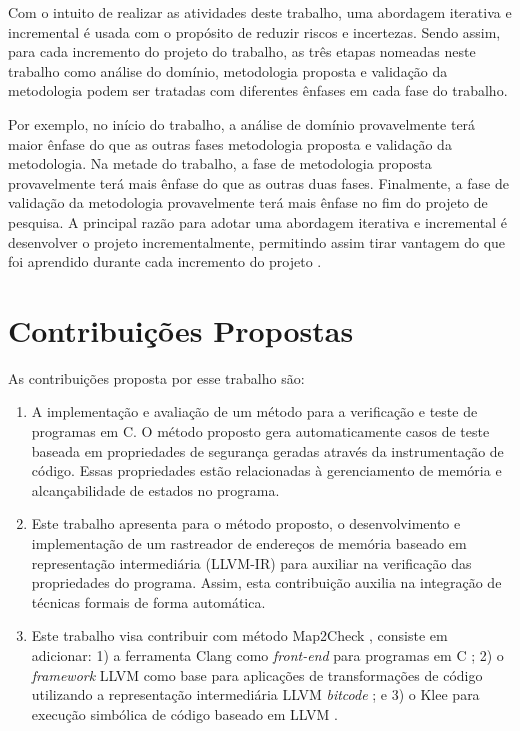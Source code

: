 \par
Com o intuito de realizar as atividades deste trabalho, uma abordagem iterativa e incremental é 
usada com o propósito de reduzir riscos e incertezas. Sendo assim, para cada incremento do
projeto do trabalho, as três etapas nomeadas neste trabalho como análise do domínio, metodologia proposta e validação da metodologia podem ser tratadas com diferentes ênfases em cada fase do trabalho.
\par
Por exemplo, no início do trabalho, a análise de domínio provavelmente terá maior ênfase do que as outras fases metodologia proposta e validação da metodologia. Na metade do trabalho, a fase de metodologia proposta provavelmente terá mais ênfase do que as outras duas fases. Finalmente, a fase de validação da metodologia provavelmente terá mais ênfase no fim do projeto de pesquisa. A principal razão para adotar uma abordagem iterativa e incremental é desenvolver o projeto incrementalmente, permitindo assim tirar vantagem do que foi aprendido durante cada incremento do projeto \cite{Schwaber:2002}.

\section{Contribuições Propostas}
As contribuições proposta por esse trabalho são: 
\begin{enumerate}
\item A implementação e avaliação de um método para a verificação e teste de programas em C. 
      O método proposto gera automaticamente casos de teste baseada em propriedades de segurança geradas através da instrumentação de código. Essas propriedades estão relacionadas à gerenciamento de memória e alcançabilidade de estados no programa.
      
\item  Este trabalho apresenta para o método proposto, o desenvolvimento e implementação de um 
      rastreador de endereços de memória baseado em representação intermediária (LLVM-IR) para auxiliar na verificação das propriedades do programa. Assim, esta contribuição auxilia na integração de técnicas formais de forma automática. 
      
\item Este trabalho visa contribuir com método Map2Check \cite{Rocha:2015}, consiste em 
     adicionar: 
     1) a ferramenta Clang como \textit{front-end} para programas em C \cite{LLVM:2017};
     2) o \textit{framework} LLVM como base para aplicações de transformações de código utilizando a representação intermediária LLVM \textit{bitcode} \cite{LLVM:2017}; e
     3) o Klee para execução simbólica de código baseado em LLVM \cite{Cadar:2008:KUA}.
\end{enumerate}
     
